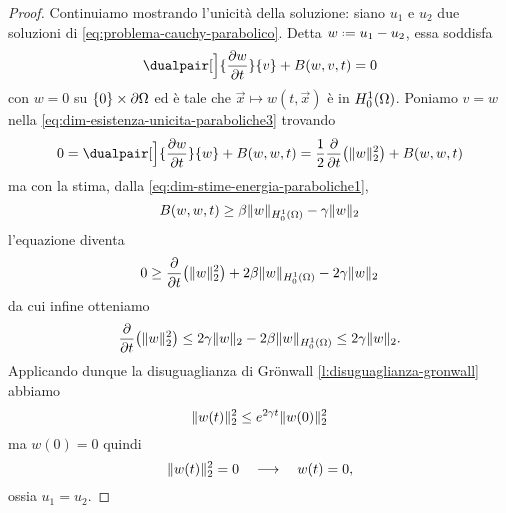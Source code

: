 \begin{proof}
    Continuiamo mostrando l'unicità della soluzione: siano $u_1$ e $u_2$ due soluzioni di \eqref{eq:problema-cauchy-parabolico}.
    Detta $w\defeq u_1-u_2$, essa soddisfa
    \begin{equation}
        \dualpair[\Big]{\drp{w}{t}}{v}+B(w,v,t)=0
        \label{eq:dim-esistenza-unicita-paraboliche3}
    \end{equation}
    con $w=0$ su $\{0\}\times\boundary\Omega$ ed è tale che $\vec x\mapsto w(t,\vec x)$ è in $\sobHc[1]{\Omega}$.
    Poniamo $v=w$ nella \eqref{eq:dim-esistenza-unicita-paraboliche3} trovando
    \begin{equation}
        0=
        \dualpair[\Big]{\drp{w}{t}}{w}+B(w,w,t)=
        \frac12\drp{}{t}\bigl(\norm{w}_2^2\bigr)+B(w,w,t)
    \end{equation}
    ma con la stima, dalla \eqref{eq:dim-stime-energia-paraboliche1},
    \begin{equation}
        B(w,w,t)\ge\beta\norm{w}_{\sobHc[1]{\Omega}}-\gamma\norm{w}_2
    \end{equation}
    l'equazione diventa
    \begin{equation}
        0\ge
        \drp{}{t}\bigl(\norm{w}_2^2\bigr)+2\beta\norm{w}_{\sobHc[1]{\Omega}}-2\gamma\norm{w}_2
    \end{equation}
    da cui infine otteniamo
    \begin{equation}
        \drp{}{t}\bigl(\norm{w}_2^2\bigr)\le
        2\gamma\norm{w}_2-2\beta\norm{w}_{\sobHc[1]{\Omega}}\le
        2\gamma\norm{w}_2.
    \end{equation}
    Applicando dunque la disuguaglianza di Grönwall \ref{l:disuguaglianza-gronwall} abbiamo
    \begin{equation}
        \norm{w(t)}_2^2\le e^{2\gamma t}\norm{w(0)}_2^2
    \end{equation}
    ma $w(0)=0$ quindi
    \begin{equation}
        \norm{w(t)}_2^2=0
        \qqq
        w(t)=0,
    \end{equation}
    ossia $u_1=u_2$.
\end{proof}
